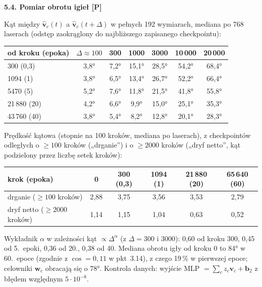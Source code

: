 \documentclass[a4paper,11pt]{article}
\newcommand{\stP}{\textcolor{pom}{\textsf{\textbf{[P]}}}}
\newcounter{pn}
\newcommand{\elem}[1]{\par\medskip\noindent\textbf{#1}\par\nopagebreak}
\begin{document}
\elem{5.4. Pomiar obrotu igieł \stP}
Kąt między $\hat{\bm v}_c(t)$ a $\hat{\bm v}_c(t+\Delta)$ w pełnych 192 wymiarach, mediana po 768 laserach (odstęp zaokrąglony do
najbliższego zapisanego checkpointu):
\begin{center}\small
\begin{tabular}{lcccccc}\toprule
od kroku (epoka) & $\Delta\approx100$ & 300 & 1000 & 3000 & 10\,000 & 20\,000\\\midrule
300 (0,3) & 3,8° & 7,2° & 15,1° & 28,5° & 54,2° & 68,4°\\
1094 (1) & 3,8° & 6,5° & 13,4° & 26,7° & 52,2° & 66,4°\\
5470 (5) & 5,2° & 7,6° & 11,8° & 21,5° & 41,8° & 55,8°\\
21\,880 (20) & 4,2° & 6,6° & 9,9° & 15,0° & 25,1° & 35,3°\\
43\,760 (40) & 3,8° & 5,4° & 8,2° & 12,8° & 20,1° & 28,3°\\\bottomrule
\end{tabular}
\end{center}
Prędkość kątowa (stopnie na 100 kroków, mediana po laserach), z checkpointów odległych o $\ge100$ kroków („drganie”) i o $\ge2000$
kroków („dryf netto”, kąt podzielony przez liczbę setek kroków):
\begin{center}\small
\begin{tabular}{lccccc}\toprule
krok (epoka) & 0 & 300 (0,3) & 1094 (1) & 21\,880 (20) & 65\,640 (60)\\\midrule
drganie ($\ge100$ kroków) & 2,88 & 3,75 & 3,56 & 3,53 & 2,79\\
dryf netto ($\ge2000$ kroków) & 1,14 & 1,15 & 1,04 & 0,63 & 0,52\\\bottomrule
\end{tabular}
\end{center}
Wykładnik $\alpha$ w zależności kąt $\propto\Delta^{\alpha}$ (z $\Delta=300$ i $3000$): 0,60 od kroku 300, 0,45 od 5.~epoki, 0,36 od 20.,
0,38 od 40. Mediana obrotu igły od kroku 0 to 84° w 60.~epoce (zgodnie z $\cos=0{,}11$ w pkt~3.14), z czego 19\,\% w pierwszej epoce;
celowniki $\bm w_c$ obracają się o 78°. Kontrola danych: wyjście MLP $=\sum_c z_c\bm v_c+\bm b_2$ z błędem względnym $5\cdot10^{-8}$.
\end{document}
